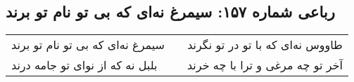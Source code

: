\begin{center}
\section*{رباعی شماره ۱۵۷: سیمرغ نه‌ای که بی تو نام تو برند}
\label{sec:sh157}
\begin{longtable}{l p{0.5cm} r}
سیمرغ نه‌ای که بی تو نام تو برند
&&
طاووس نه‌ای که با تو در تو نگرند
\\
بلبل نه که از نوای تو جامه درند
&&
آخر تو چه مرغی و ترا با چه خرند
\\
\end{longtable}
\end{center}
